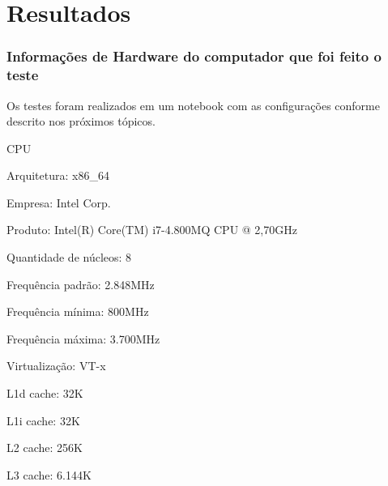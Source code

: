 \part{Resultados}



\section{Informações de Hardware do computador que foi feito o teste}

Os testes foram realizados em um notebook com as configurações conforme
descrito nos próximos tópicos.

\begin{alineas}

  \item CPU

  \begin{alineas}

     \item Arquitetura: x86\_64

     \item Empresa: Intel Corp.

     \item Produto: Intel(R) Core(TM) i7-4.800MQ CPU @ 2,70GHz

     \item Quantidade de núcleos: 8

     \item Frequência padrão: 2.848MHz

     \item Frequência mínima:  800MHz

     \item Frequência máxima: 3.700MHz

     \item Virtualização: VT-x

     \item L1d cache: 32K

     \item L1i cache: 32K

     \item L2 cache: 256K

     \item L3 cache: 6.144K

  \end{alineas}


\end{alineas}
